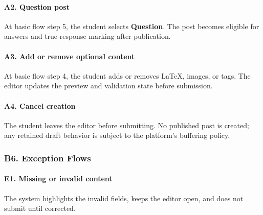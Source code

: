 \documentclass[12pt]{article}
\begin{document}
\hypertarget{sec:a2-question-post}{}
\paragraph*{A2. Question post}
\par\medskip

At basic flow step 5, the student selects \textbf{Question}. The post becomes eligible for answers and true-response marking after publication.
\par\medskip

\hypertarget{sec:a3-add-or-remove-optional-content}{}
\paragraph*{A3. Add or remove optional content}
\par\medskip

At basic flow step 4, the student adds or removes LaTeX, images, or tags. The editor updates the preview and validation state before submission.
\par\medskip

\hypertarget{sec:a4-cancel-creation}{}
\paragraph*{A4. Cancel creation}
\par\medskip

The student leaves the editor before submitting. No published post is created; any retained draft behavior is subject to the platform's buffering policy.
\par\medskip

\hypertarget{sec:b6-exception-flows}{}
\subsubsection*{B6. Exception Flows}
\par\medskip

\hypertarget{sec:e1-missing-or-invalid-content}{}
\paragraph*{E1. Missing or invalid content}
\par\medskip

The system highlights the invalid fields, keeps the editor open, and does not submit until corrected.
\par\medskip
\end{document}
